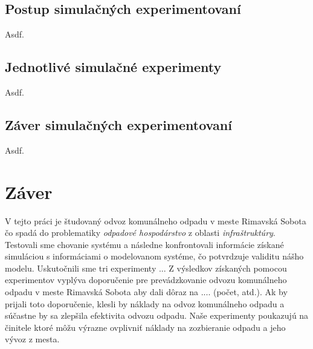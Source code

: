 \documentclass[11pt,a4paper]{article}
\begin{document}
    \subsection{Postup simulačných experimentovaní}

        Asdf.

    \subsection{Jednotlivé simulačné experimenty}

        Asdf.

    \subsection{Záver simulačných experimentovaní}

        Asdf.

\section{Záver}

    \indent V tejto práci je študovaný odvoz komunálneho odpadu v meste Rimavská Sobota čo spadá do problematiky \textit{odpadové hospodárstvo} z oblasti \textit{infraštruktúry}. Testovali sme chovanie systému a následne konfrontovali informácie získané simuláciou s informáciami o modelovanom systéme, čo potvrdzuje validitu nášho modelu. Uskutočnili sme tri experimenty ... Z výsledkov získaných pomocou experimentov vyplýva doporučenie pre prevádzkovanie odvozu komunálneho odpadu v meste Rimavská Sobota aby dali dôraz na .... (počet, atd.). Ak by prijali toto doporučenie, klesli by náklady na odvoz komunálneho odpadu a súčastne by sa zlepšila efektivita odvozu odpadu. Naše experimenty poukazujú na činitele ktoré môžu výrazne ovplivniť náklady na zozbieranie odpadu a jeho vývoz z mesta.


\newpage %

\makeatletter
\makeatother

\begin{flushleft}
    
\end{flushleft}
\end{document}
